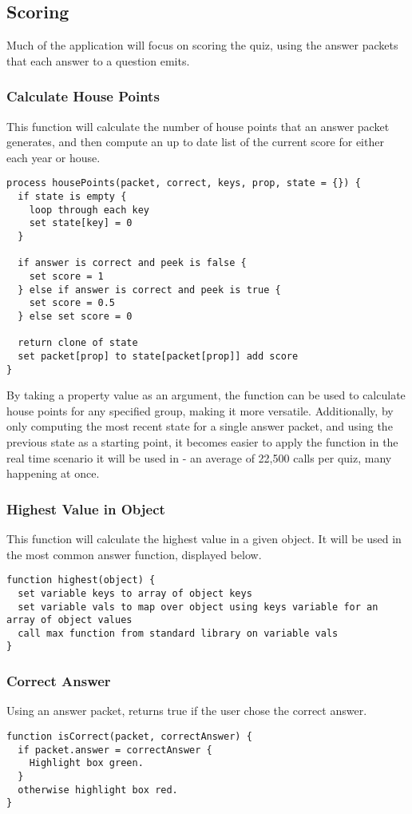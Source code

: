 \subsection{Scoring}
Much of the application will focus on scoring the quiz, using the answer packets that each answer to a question emits.

\subsubsection{Calculate House Points}
This function will calculate the number of house points that an answer packet generates, and then compute an up to date list of the current score for either each year or house.
\begin{verbatim}
process housePoints(packet, correct, keys, prop, state = {}) {
  if state is empty {
    loop through each key
    set state[key] = 0
  }

  if answer is correct and peek is false {
    set score = 1
  } else if answer is correct and peek is true {
    set score = 0.5
  } else set score = 0

  return clone of state
  set packet[prop] to state[packet[prop]] add score
}
\end{verbatim}
By taking a property value as an argument, the function can be used to calculate house points for any specified group, making it more versatile. Additionally, by only computing the most recent state for a single answer packet, and using the previous state as a starting point, it becomes easier to apply the function in the real time scenario it will be used in - an average of 22,500 calls per quiz, many happening at once.

\subsubsection{Highest Value in Object}
This function will calculate the highest value in a given object. It will be used in the most common answer function, displayed below.
\begin{verbatim}
function highest(object) {
  set variable keys to array of object keys
  set variable vals to map over object using keys variable for an array of object values
  call max function from standard library on variable vals
}
\end{verbatim}

\subsubsection{Correct Answer}
Using an answer packet, returns true if the user chose the correct answer.
\begin{verbatim}
function isCorrect(packet, correctAnswer) {
  if packet.answer = correctAnswer {
    Highlight box green.
  }
  otherwise highlight box red.
}
\end{verbatim}

